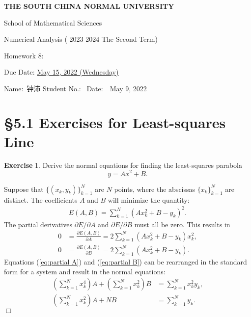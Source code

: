 \documentclass[UTF8,12pt,hyperref]{ctexart}
\makeatletter
\newenvironment{exercise}[1][{\color{blue}\bf Exercise}]%
{%
 \begin{center}   \begin{lrbox}{\@tempboxa}%
    \begin{minipage}{\textwidth}%
  {\color{blue}\bfseries
#1}   }{%
    \end{minipage}%
    \end{lrbox}
    \colorbox{green}{\noindent\usebox{\@tempboxa}} \end{center}  
}
\newenvironment{solve}[1][\color{blue}\bf Solve]{\begin{trivlist}
\item[\hskip \labelsep {\color{blue}\bfseries
#1}]}{\hfill$\Box$\end{trivlist}}
\makeatother
\begin{document}

\begin{center}
{\bf  THE SOUTH CHINA NORMAL UNIVERSITY\vspace{0.08cm}

School of Mathematical Sciences\vspace{0.08cm}
 
Numerical Analysis ( 2023-2024 The Second Term) \vspace{0.18cm}

{\Large Homework 8: }\vspace{0.18cm}

Due Date: \underline{May 15, 2022 (Wednesday)} }
\end{center}\vspace{-0.16cm}

\begin{center}
  Name:\ \underline{\qquad 钟沛 \hspace{1cm}}\hspace{0.298cm}  
  Student No.:\ \underline{\hspace{1cm}} 
%
Date:\ \ \underline{May 9, 2022} 
 \end{center}
 
 

\section*{\S 5.1 Exercises for Least-squares Line}
  
\begin{exercise}1.\qquad
 Derive the normal equations for finding the least-squares parabola 
  $$
 y=Ax^2+B.
 $$ 
 \end{exercise}   
  
\begin{solve}
  Suppose that $\{(x_k,y_k)\}_{k=1}^N$ are $N$ points, where the abscissas $\{x_k\}_{k=1}^N$ are distinct.
  The coefficients $A$ and $B$ will minimize the quantity:
  \begin{align*}
    E(A,B) = \sum\limits_{k=1}^N(Ax_k^2+B-y_k)^2.
  \end{align*}
  The partial derivatives $\partial E/\partial A$ and $\partial E/\partial B$ must all be zero.
  This results in 
  \begin{align}
    0&=\frac{\partial E(A,B)}{\partial A}= 2\sum\limits_{k=1}^N (Ax_k^2+B-y_k)x_k^2,\label{eq:partial A}\\
    0&=\frac{\partial E(A,B)}{\partial B}= 2\sum\limits_{k=1}^N (Ax_k^2+B-y_k).\label{eq:partial B}
  \end{align}
  Equations (\ref{eq:partial A}) and (\ref{eq:partial B}) can be rearranged in the standard form for a system
  and result in the normal equations:
  \begin{align}
    (\sum\limits_{k=1}^{N}x_k^4)A+(\sum\limits_{k=1}^Nx_k^2)B&=\sum\limits_{k=1}^N x_k^2y_k,\\
    (\sum\limits_{k=1}^{N}x_k^2)A+NB&=\sum\limits_{k=1}^N y_k.
  \end{align}
\end{solve}
\end{document}
